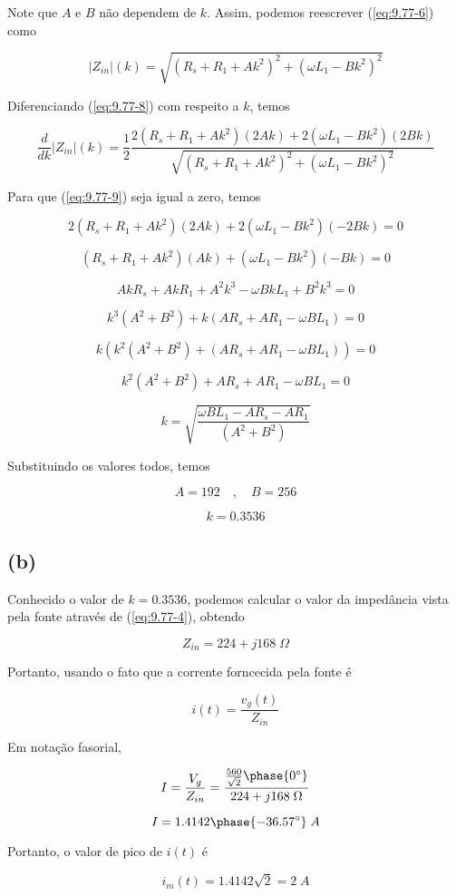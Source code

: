 Note que  \(A\) e \(B\) não dependem de \(k\). Assim, podemos reescrever (\ref{eq:9.77-6}) como

\begin{equation}\label{eq:9.77-8}\tag{9.77-8}
    |Z_{in}|(k) = \sqrt{\left(R_s + R_1 + A k^2\right)^2 + \left(\omega L_1 - B k^2\right)^2}
\end{equation}

Diferenciando (\ref{eq:9.77-8}) com respeito a \(k\), temos

\begin{equation}\label{eq:9.77-9}\tag{9.77-9}
    \frac{d}{dk}|Z_{in}|(k) = \frac{1}{2}\frac{2(R_s + R_1 + A k^2)(2Ak) + 2(\omega L_1 - B k^2)(2Bk)}{\sqrt{\left(R_s + R_1 + A k^2\right)^2 + \left(\omega L_1 - B k^2\right)^2}}
\end{equation}

Para que (\ref{eq:9.77-9}) seja igual a zero, temos

\[ 2(R_s + R_1 + A k^2)(2Ak) + 2(\omega L_1 - B k^2)(-2Bk) = 0 \]

\[ (R_s + R_1 + A k^2)(Ak) + (\omega L_1 - B k^2)(-Bk) = 0 \]

\[ AkR_s + AkR_1 + A^2k^3 - \omega BkL_1 + B^2k^3 = 0 \]

\[ k^3(A^2+B^2) + k(AR_s + AR_1 - \omega BL_1) = 0 \]

\[ k\left(k^2(A^2+B^2) + (AR_s + AR_1 - \omega BL_1)\right) = 0 \]

\[ k^2(A^2+B^2) + AR_s + AR_1 - \omega BL_1 = 0 \]

\[ k = \sqrt{\frac{\omega BL_1 - AR_s - AR_1 }{(A^2+B^2)}} \]

Substituindo os valores todos, temos

\[ A = 192 \quad , \quad B = 256 \]

\[ \boxed{k = 0.3536} \]

\subsection*{(b)}

Conhecido o valor de \(k = 0.3536\), podemos calcular o valor da impedância vista pela fonte através de (\ref{eq:9.77-4}), obtendo

\[ Z_{in} = 224 + j168 \; \Omega \]

Portanto, usando o fato que a corrente forncecida pela fonte é

\[ i(t) = \frac{v_g(t)}{Z_{in}} \]

Em notação fasorial,

\[ I = \frac{V_g}{Z_{in}} = \frac{\frac{560}{\sqrt{2}}\phase{0^{\circ}}}{224 + j168 \; \Omega} \]

\[ I = 1.4142\phase{-36.57^{\circ}} \; A \]

Portanto, o valor de pico de \(i(t)\) é

\[ \boxed{i_m(t) = 1.4142 \sqrt{2} = 2 \; A}  \]
